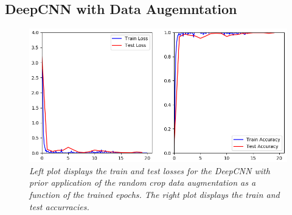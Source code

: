 \documentclass[a4paper]{article}
\begin{document}
\subsection{DeepCNN with Data Augemntation}\label{sec:deepCNN_augmented}

\begin{figure}
     \centering
     \includegraphics[height=0.25\paperwidth]{graphics/nets/CNN13_with_Augmentation_Results}
     \caption{\textit{Left plot displays the train and test losses for the DeepCNN with prior application of the random crop data augmentation as a function of the trained epochs. The right plot displays the train and test accurracies.}}
     \label{fig:deepCNN_augmented}
\end{figure}
\end{document}
